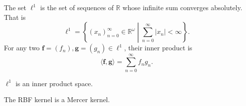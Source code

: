\begin{definition}[$\ell^1$]
    The set $\ell^{1}$ is the set of sequences of $\mathbb{R}$ whose infinite sum converges absolutely.
    That is
    \begin{equation*}
        \ell^{1} = \left\{ (x_n)_{n=0}^{\infty} \in \mathbb{R}^{\omega} \middle| \sum_{n=0}^{\infty} \lvert x_n \rvert < \infty \right\}.
    \end{equation*}
    For any two $\mathbf{f} = (f_n), \mathbf{g} = (g_n) \in \ell^{1}$, their inner product is
    \begin{equation*}
        \langle \mathbf{f}, \mathbf{g} \rangle = \sum\limits_{n=0}^{\infty} f_ng_n.
    \end{equation*}
\end{definition}
\begin{proposition}
    $\ell^{1}$ is an inner product space.
\end{proposition}
\begin{theorem}
    The RBF kernel is a Mercer kernel.
\end{theorem}
%
%
